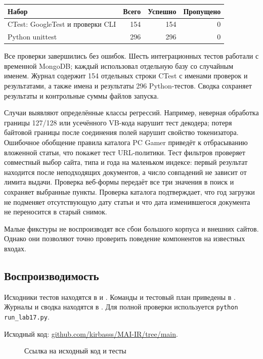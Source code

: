 \documentclass[12pt,a4paper]{article}
\begin{document}
\begin{center}
\begin{tabular}{@{}lrrr@{}}
\toprule
Набор & Всего & Успешно & Пропущено\\
\midrule
CTest: GoogleTest и проверки CLI & 154 & 154 & 0\\
Python unittest & 296 & 296 & 0\\
\bottomrule
\end{tabular}
\end{center}

Все проверки завершились без ошибок. Шесть интеграционных тестов
работали с временной MongoDB; каждый использовал отдельную базу со случайным
именем. Журнал содержит 154 отдельных строки CTest с именами
проверок и результатами, а также имена и результаты 296 Python-тестов.
Сводка сохраняет результаты и контрольные суммы файлов запуска.

Случаи выявляют определённые классы регрессий. Например, неверная
обработка границы 127/128 или усечённого VB-кода нарушит тест декодера;
потеря байтовой границы после соединения полей нарушит свойство
токенизатора. Ошибочное обобщение правила каталога PC Gamer приведёт
к отбрасыванию вложенной статьи, что покажет тест URL-политики.
Тест фильтров проверяет совместный выбор сайта, типа и года на маленьком
индексе: первый результат находится после неподходящих документов, а
число совпадений не зависит от лимита выдачи. Проверка веб-формы передаёт
все три значения в поиск и сохраняет выбранные пункты. Проверка каталога
подтверждает, что год загрузки не подменяет отсутствующую дату статьи и
что дата изменившегося документа не переносится в старый снимок.

Малые фикстуры не воспроизводят все сбои большого корпуса и внешних сайтов.
Однако они позволяют точно проверить поведение компонентов на известных входах.

\subsection{Воспроизводимость}
Исходники тестов находятся в  и .
Команды и тестовый план приведены в .
Журналы и сводка находятся в .
Для полной проверки используется \verb|python run_lab17.py|.

Исходный код:
\href{https://github.com/kirbasss/MAI-IR/tree/main}{github.com/kirbasss/MAI-IR/tree/main}.
\begin{figure}[H]
\centering
\begingroup
\hypersetup{urlcolor=black}
\endgroup
\caption{Ссылка на исходный код и тесты}
\end{figure}
\end{document}

